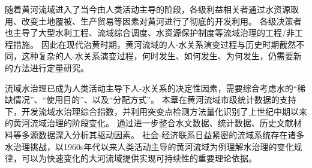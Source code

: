 随着黄河流域进入了当今由人类活动主导的阶段，各级利益相关者通过水资源取用、改变土地覆被、生产贸易等因素对黄河进行了彻底的开发利用。
各级决策者也主导了大型水利工程、流域综合调度、水资源保护制度等流域治理的工程/非工程措施。
因此在现代治黄时期，黄河流域的人-水关系演变过程与历史时期截然不同，这种复杂的人-水关系演变过程，何时发生、如何发生、为何发生，仍需要新的方法进行定量研究。

流域水治理已成为人类活动主导下人-水关系的决定性因素，需要综合考虑水的“稀缺情况”、“使用目的”、以及“分配方式”。
本章在黄河流域市级统计数据的支持下，开发流域水治理综合指数，并利用突变点检测方法量化识别了上世纪中期以来的黄河流域治理的阶段变化。
通过进一步整合水文数据、统计数据、历史文献材料等多源数据深入分析其驱动因素。
社会-经济联系日益紧密的流域系统存在诸多水治理挑战，以1960s年代以来人类活动主导的黄河流域为例理解水治理的变化规律，可以为快速变化的大河流域提供实现可持续性的重要理论依据。
